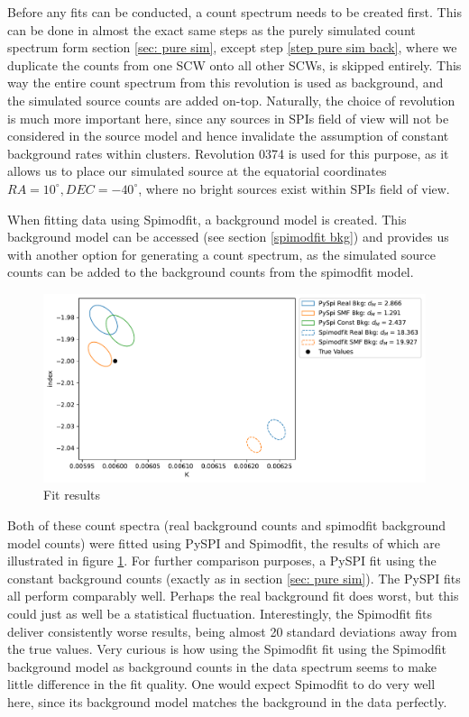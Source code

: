 \documentclass{report}
\begin{document}
Before any fits can be conducted, a count spectrum needs to be created first. This can be done in almost the exact same steps as the purely simulated count spectrum form section \ref{sec: pure sim}, except step \ref{step pure sim back}, where we duplicate the counts from one SCW onto all other SCWs, is skipped entirely. This way the entire count spectrum from this revolution is used as background, and the simulated source counts are added on-top. Naturally, the choice of revolution is much more important here, since any sources in SPIs field of view will not be considered in the source model and hence invalidate the assumption of constant background rates within clusters. Revolution 0374 is used for this purpose, as it allows us to place our simulated source at the equatorial coordinates $RA=10^\circ, DEC=-40^\circ$, where no bright sources exist within SPIs field of view.

When fitting data using Spimodfit, a background model is created. This background model can be accessed (see section \ref{spimodfit bkg}) and provides us with another option for generating a count spectrum, as the simulated source counts can be added to the background counts from the spimodfit model.

\begin{figure}[h]
  \centering
  \includegraphics[width=\textwidth]{Images/SMF_Comparison/spimodfit_comparison_combined_plot.pdf}
  \caption{Fit results }
  \label{fig smf comparison}
\end{figure}

Both of these count spectra (real background counts and spimodfit background model counts) were fitted using PySPI and Spimodfit, the results of which are illustrated in figure \ref{fig smf comparison}. For further comparison purposes, a PySPI fit using the constant background counts (exactly as in section \ref{sec: pure sim}). The PySPI fits all perform comparably well. Perhaps the real background fit does worst, but this could just as well be a statistical fluctuation. Interestingly, the Spimodfit fits deliver consistently worse results, being almost 20 standard deviations away from the true values. Very curious is how using the Spimodfit fit using the Spimodfit background model as background counts in the data spectrum seems to make little difference in the fit quality. One would expect Spimodfit to do very well here, since its background model matches the background in the data perfectly.
\end{document}
